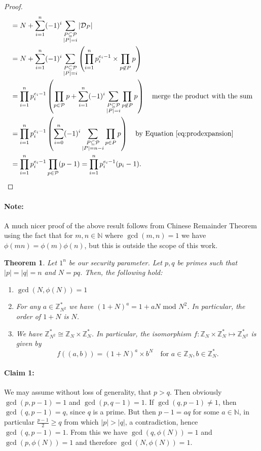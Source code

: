 \documentclass{article}
\newtheorem{theorem}{Theorem}[section]
\theoremstyle{definition}
\newcommand{\D}{\mathcal{D}}
\renewcommand{\P}{\mathcal{P}}
\newcommand{\Int}{\mathbb{Z}}
\newcommand{\Nat}{\mathbb{N}}
\renewcommand{\mod}{\,\,\text{mod}\,\,}
\begin{document}
\begin{proof}
\begin{align*}
                   &= N + \sum_{i = 1}^n (-1)^i \sum_{\substack{P \subseteq \P \\ |P| =
    i}} |\D_P| \\
                   &= N + \sum_{i = 1}^n (-1)^i \sum_{\substack{P \subseteq \P \\ |P| =
        i}} \left(  \prod_{i = 1}^n p_i^{e_i - 1} \times \prod_{p \not\in P}p \right)\\
                   &= \prod_{i = 1}^n p_i^{e_i - 1} \left( \prod_{p\in\P}p +  \sum_{i = 1}^n (-1)^i \sum_{\substack{P \subseteq \P \\ |P| =
    i}} \prod_{p \not\in P}p \right) \quad \text{merge the product with the sum}\\
                   &= \prod_{i = 1}^n p_i^{e_i - 1} \left( \sum_{i = 0}^n (-1)^i
 \sum_{\substack{P \subseteq \P \\ |P| = n - i}} \prod_{p \in P}p \right) \quad\text{by Equation \ref{eq:prodexpansion}}\\
                   &=\prod_{i = 1}^n p_i^{e_i - 1}\prod_{p \in \P} (p - 1) = \prod_{i = 1}^n p_i^{e_i - 1}(p_i - 1).
 \end{align*}
\end{proof}
\paragraph{Note:} A much nicer proof of the above result follows from Chinese
Remainder Theorem using the fact that for $m, n \in \Nat$ where $\gcd(m, n) = 1$
we have $\phi(mn) = \phi(m)\phi(n)$, but this is outside the scope of this work. 
\begin{theorem}
  \label{thm:paillierthms}
Let $1^n$ be our security parameter. Let $p, q$ be primes such that
$|p| = |q| = n$ and $N = pq$. Then, the following hold:
\begin{enumerate}
\item $\gcd(N, \phi(N)) = 1$
\item For any $a \in \Int_{N^2}^*$ we have $(1 + N)^a = 1 + aN \mod N^2$. In
  particular, the order of $1 + N$ is $N$.
\item We have $\Int_{N^2}^* \cong \Int_{N} \times \Int_{N}^*$.
In particular, the isomorphism $f:\Int_{N} \times \Int_{N}^* \mapsto \Int_{N^2}^*$
is given by
\[
   f((a, b)) = (1 + N)^a \times b^N \quad\text{for}\,\, a \in \Int_{N}, b \in \Int_{N}^*.
\]
\end{enumerate}  
\end{theorem}
\paragraph{Claim 1:} We may assume without loss of generality, that $p > q$.
Then obviously $\gcd(p, p - 1) = 1$ and $\gcd(p, q - 1) = 1$. If $\gcd(q, p - 1)
\neq 1$, then $\gcd(q, p - 1) = q$, since $q$ is a prime. But then $p - 1 = aq$
for some $a \in \Nat$, in particular $\frac{p - 1}{2} \geq q$ from which $|p| >
|q|$, a contradiction, hence $\gcd(q, p - 1) = 1$. From this we have $\gcd(q,
\phi(N)) = 1$ and $\gcd(p, \phi(N)) = 1$ and therefore $\gcd(N, \phi(N)) = 1$.
\end{document}
